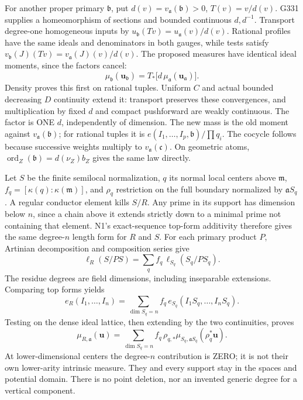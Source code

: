 For another proper primary \(\mathfrak b\), put \(d(v)=v_{\mathfrak a}(\mathfrak b)>0\), \(T(v)=v/d(v)\). G331 supplies a homeomorphism of sections and bounded continuous \(d,d^{-1}\). Transport degree-one homogeneous inputs by \(u_{\mathfrak b}(Tv)=u_{\mathfrak a}(v)/d(v)\). Rational profiles have the same ideals and denominators in both gauges, while tests satisfy \(v_{\mathfrak b}(J)(Tv)=v_{\mathfrak a}(J)(v)/d(v)\). The proposed measures have identical ideal moments, since the factors cancel:
\[
\mu_{\mathfrak b}(\boldsymbol u_{\mathfrak b})
=T_*\big[d\,\mu_{\mathfrak a}(\boldsymbol u_{\mathfrak a})\big]. \tag{GAUGE}
\]
Density proves this first on rational tuples. Uniform \(C\) and actual bounded decreasing \(D\) continuity extend it: transport preserves these convergences, and multiplication by fixed \(d\) and compact pushforward are weakly continuous. The factor is ONE \(d\), independently of dimension. The new mass is the old moment against \(v_{\mathfrak a}(\mathfrak b)\); for rational tuples it is \(e(I_1,\ldots,I_p,\mathfrak b)/\prod q_i\). The cocycle follows because successive weights multiply to \(v_{\mathfrak a}(\mathfrak c)\). On geometric atoms, \(\operatorname{ord}_Z(\mathfrak b)=d(\nu_Z)b_Z\) gives the same law directly.

Let \(S\) be the finite semilocal normalization, \(q\) its normal local centers above \(\mathfrak m\), \(f_q=[\kappa(q):\kappa(\mathfrak m)]\), and \(\rho_q\) restriction on the full boundary normalized by \(\mathfrak aS_q\). A regular conductor element kills \(S/R\). Any prime in its support has dimension below \(n\), since a chain above it extends strictly down to a minimal prime not containing that element. N1's exact-sequence top-form additivity therefore gives the same degree-\(n\) length form for \(R\) and \(S\). For each primary product \(P\), Artinian decomposition and composition series give
\[
\ell_R(S/PS)=\sum_q f_q\,\ell_{S_q}(S_q/PS_q).
\]
The residue degrees are field dimensions, including inseparable extensions. Comparing top forms yields
\[
e_R(I_1,\ldots,I_n)
=\sum_{\dim S_q=n}f_q\,e_{S_q}(I_1S_q,\ldots,I_nS_q).
\]
Testing on the dense ideal lattice, then extending by the two continuities, proves
\[
\mu_{R,\mathfrak a}(\boldsymbol u)
=\sum_{\dim S_q=n}f_q\,\rho_{q,*}
 \mu_{S_q,\mathfrak aS_q}(\rho_q^*\boldsymbol u). \tag{NORMAL}
\]
At lower-dimensional centers the degree-\(n\) contribution is ZERO; it is not their own lower-arity intrinsic measure. They and every support stay in the spaces and potential domain. There is no point deletion, nor an invented generic degree for a vertical component.

